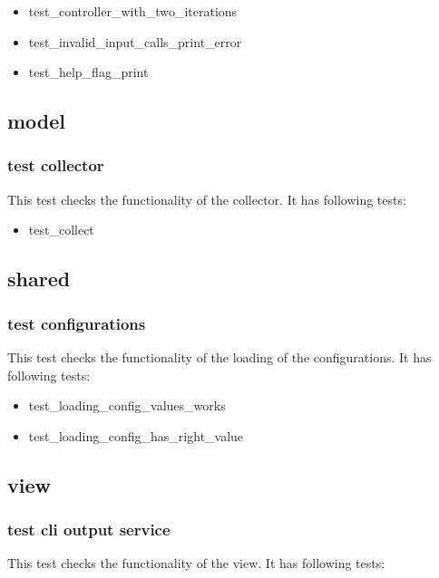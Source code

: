 \documentclass[parskip=full]{scrartcl}
\begin{document}
\begin{itemize}

\item test\_controller\_with\_two\_iterations

\item test\_invalid\_input\_calls\_print\_error

\item test\_help\_flag\_print

\end{itemize}

\subsection{model}
\subsubsection{test collector}
This test checks the functionality of the collector.
It has following tests:

\begin{itemize}

\item test\_collect

\end{itemize}

\subsection{shared}
\subsubsection{test configurations}
This test checks the functionality of the loading of the configurations.
It has following tests:

\begin{itemize}

\item test\_loading\_config\_values\_works

\item test\_loading\_config\_has\_right\_value

\end{itemize}

\subsection{view}
\subsubsection{test cli output service}
This test checks the functionality of the view.
It has following tests:
\end{document}
